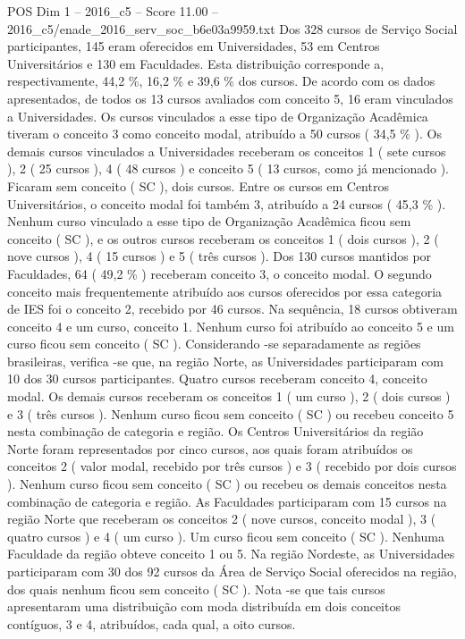 \begin{textsample}{POS Dim 1 – 2016\_c5 – Score 11.00 – 2016\_c5/enade\_2016\_serv\_soc\_b6e03a9959.txt}
Dos 328 cursos de Serviço Social participantes, 145 eram oferecidos em Universidades, 53 em Centros Universitários e 130 em Faculdades.
Esta distribuição corresponde a, respectivamente, 44,2 \%, 16,2 \% e 39,6 \% dos cursos.
De acordo com os dados apresentados, de todos os 13 cursos avaliados com conceito 5, 16 eram vinculados a Universidades.
Os cursos vinculados a esse tipo de Organização Acadêmica tiveram o conceito 3 como conceito modal, atribuído a 50 cursos ( 34,5 \% ).
Os demais cursos vinculados a Universidades receberam os conceitos 1 ( sete cursos ), 2 ( 25 cursos ), 4 ( 48 cursos ) e conceito 5 ( 13 cursos, como já mencionado ).
Ficaram sem conceito ( SC ), dois cursos.
Entre os cursos em Centros Universitários, o conceito modal foi também 3, atribuído a 24 cursos ( 45,3 \% ).
Nenhum curso vinculado a esse tipo de Organização Acadêmica ficou sem conceito ( SC ), e os outros cursos receberam os conceitos 1 ( dois cursos ), 2 ( nove cursos ), 4 ( 15 cursos ) e 5 ( três cursos ).
Dos 130 cursos mantidos por Faculdades, 64 ( 49,2 \% ) receberam conceito 3, o conceito modal.
O segundo conceito mais frequentemente atribuído aos cursos oferecidos por essa categoria de IES foi o conceito 2, recebido por 46 cursos.
Na sequência, 18 cursos obtiveram conceito 4 e um curso, conceito 1.
Nenhum curso foi atribuído ao conceito 5 e um curso ficou sem conceito ( SC ).
Considerando -se separadamente as regiões brasileiras, verifica -se que, na região Norte, as Universidades participaram com 10 dos 30 cursos participantes.
Quatro cursos receberam conceito 4, conceito modal.
Os demais cursos receberam os conceitos 1 ( um curso ), 2 ( dois cursos ) e 3 ( três cursos ).
Nenhum curso ficou sem conceito ( SC ) ou recebeu conceito 5 nesta combinação de categoria e região.
Os Centros Universitários da região Norte foram representados por cinco cursos, aos quais foram atribuídos os conceitos 2 ( valor modal, recebido por três cursos ) e 3 ( recebido por dois cursos ).
Nenhum curso ficou sem conceito ( SC ) ou recebeu os demais conceitos nesta combinação de categoria e região.
As Faculdades participaram com 15 cursos na região Norte que receberam os conceitos 2 ( nove cursos, conceito modal ), 3 ( quatro cursos ) e 4 ( um curso ).
Um curso ficou sem conceito ( SC ).
Nenhuma Faculdade da região obteve conceito 1 ou 5.
Na região Nordeste, as Universidades participaram com 30 dos 92 cursos da Área de Serviço Social oferecidos na região, dos quais nenhum ficou sem conceito ( SC ).
Nota -se que tais cursos apresentaram uma distribuição com moda distribuída em dois conceitos contíguos, 3 e 4, atribuídos, cada qual, a oito cursos.

\end{textsample}
